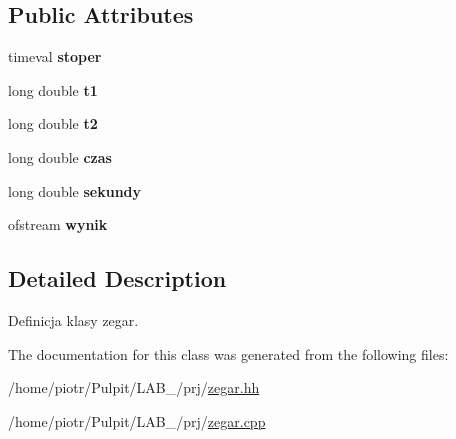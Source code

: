 \subsection*{\-Public \-Attributes}
\begin{DoxyCompactItemize}
\item 
\hypertarget{classzegar_a4c16d3b27f74dc7760b8a23269a20a7b}{timeval {\bfseries stoper}}\label{classzegar_a4c16d3b27f74dc7760b8a23269a20a7b}

\item 
\hypertarget{classzegar_aafb4ae592701809482f334fb0d3e55bf}{long double {\bfseries t1}}\label{classzegar_aafb4ae592701809482f334fb0d3e55bf}

\item 
\hypertarget{classzegar_ac32f1b83ea11b875ba4356afba430581}{long double {\bfseries t2}}\label{classzegar_ac32f1b83ea11b875ba4356afba430581}

\item 
\hypertarget{classzegar_a2249608c9a5286bba25e22a8d607dc5c}{long double {\bfseries czas}}\label{classzegar_a2249608c9a5286bba25e22a8d607dc5c}

\item 
\hypertarget{classzegar_ae51c387a5599badba9221824ae75b1de}{long double {\bfseries sekundy}}\label{classzegar_ae51c387a5599badba9221824ae75b1de}

\item 
\hypertarget{classzegar_ab52ebd6c7d2692754d05935d9b777be9}{ofstream {\bfseries wynik}}\label{classzegar_ab52ebd6c7d2692754d05935d9b777be9}

\end{DoxyCompactItemize}


\subsection{\-Detailed \-Description}
\-Definicja klasy zegar. 



\-The documentation for this class was generated from the following files\-:\begin{DoxyCompactItemize}
\item 
/home/piotr/\-Pulpit/\-L\-A\-B\-\_/prj/\hyperlink{zegar_8hh}{zegar.\-hh}\item 
/home/piotr/\-Pulpit/\-L\-A\-B\-\_/prj/\hyperlink{zegar_8cpp}{zegar.\-cpp}\end{DoxyCompactItemize}
